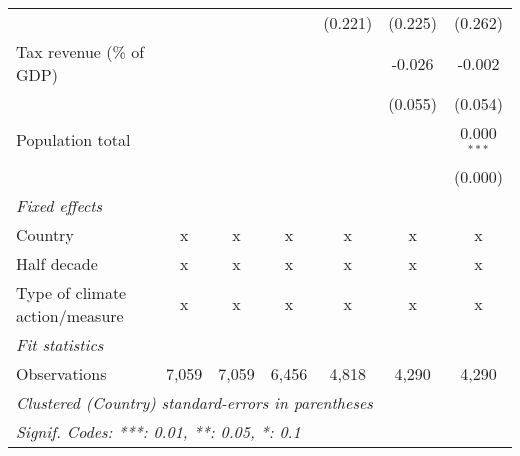 \begin{tabular}{lcccccc}
                                                                              &              &              &         & (0.221) & (0.225) & (0.262)\\   
   Tax revenue (\% of GDP)                                                    &              &              &         &         & -0.026  & -0.002\\   
                                                                              &              &              &         &         & (0.055) & (0.054)\\   
   Population total                                                           &              &              &         &         &         & 0.000$^{***}$\\   
                                                                              &              &              &         &         &         & (0.000)\\   
   \emph{Fixed effects}\\
   Country                                                                    & x            & x            & x       & x       & x       & x\\  
   Half decade                                                                & x            & x            & x       & x       & x       & x\\  
   Type of climate action/measure                                             & x            & x            & x       & x       & x       & x\\  
   \midrule \emph{Fit statistics}\\
   Observations                                                               & 7,059        & 7,059        & 6,456   & 4,818   & 4,290   & 4,290\\  
   \midrule
   \multicolumn{7}{l}{\emph{Clustered (Country) standard-errors in parentheses}}\\
   \multicolumn{7}{l}{\emph{Signif. Codes: ***: 0.01, **: 0.05, *: 0.1}}\\
\end{tabular}
\par\endgroup


